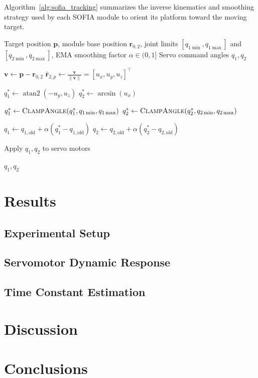 \documentclass[lettersize,journal]{IEEEtran}
\begin{document}
	Algorithm~\ref{alg:sofia_tracking} summarizes the inverse kinematics and smoothing strategy used by each SOFIA module to orient its platform toward the moving target.
	
	\begin{algorithm}[!t]
		\caption{SOFIA module target tracking control}
		\label{alg:sofia_tracking}
		
		
		\begin{algorithmic}[1]
			
			\Require Target position $\mathbf{p}$, module base position $\mathbf{r}_{0,2}$, joint limits $[q_{1\min}, q_{1\max}]$ and $[q_{2\min}, q_{2\max}]$, EMA smoothing factor $\alpha \in (0, 1]$
			\Ensure Servo command angles $q_1, q_2$
			
			\State $\mathbf{v} \gets \mathbf{p} - \mathbf{r}_{0,2}$
			\State $\hat{\mathbf{r}}_{2,p} \gets \frac{\mathbf{v}}{\|\mathbf{v}\|} = [u_x, u_y, u_z]^\top$ 
			
			\State $q_1^* \gets \operatorname{atan2}(-u_y, u_z)$
			\State $q_2^* \gets \arcsin(u_x)$ 
			
			\State $q_1^* \gets \Call{ClampAngle}{q_1^*, q_{1\min}, q_{1\max}}$
			\State $q_2^* \gets \Call{ClampAngle}{q_2^*, q_{2\min}, q_{2\max}}$
			
			\State $q_1 \gets q_{1,\text{old}} + \alpha (q_1^* - q_{1,\text{old}})$ 
			\State $q_2 \gets q_{2,\text{old}} + \alpha (q_2^* - q_{2,\text{old}})$
			
			\State Apply $q_1, q_2$ to servo motors
			
			\State \Return $q_1, q_2$
			
		\end{algorithmic}
	\end{algorithm}
	
	
	\section{Results}
	\label{sec:results}
	
	\subsection{Experimental Setup}
	
	\subsection{Servomotor Dynamic Response}
	
	\subsection{Time Constant Estimation}


	\section{Discussion}
	\label{sec:discussion}
	
	\section{Conclusions}
	\label{sec:conclusions}
	
	
	
	\balance
	
	
	
	
\end{document}
